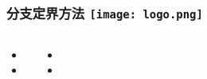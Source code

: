 \begin{comment}
\end{comment}
\begin{frame}
\frametitle{分支定界方法 \hfill \texttt{[image: logo.png]}}
\begin{columns}
	\begin{itemize}
		\item 
		\vspace{0.2cm}
		\item 
	\end{itemize}
	\begin{itemize}
		\item 
		\vspace{0.5cm}
		\item
	\end{itemize}
\end{columns}
\end{frame}

